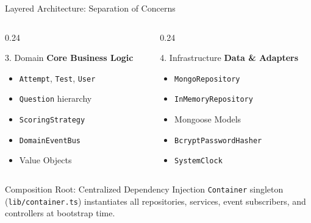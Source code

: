 ﻿\documentclass[aspectratio=169,10pt,t]{beamer}
\begin{document}
\begin{frame}{Layered Architecture: Separation of Concerns}
\begin{columns}[T]
    \begin{column}{0.24\textwidth}
      \begin{infoCard}{3. Domain}
        \textbf{Core Business Logic}\\[0.6mm]
        \fontsize{5.8pt}{7.0pt}\selectfont
        \begin{itemize}\setlength{\itemsep}{1pt}\setlength{\parskip}{0pt}\setlength{\leftmargini}{6pt}
          \item \texttt{Attempt}, \texttt{Test}, \texttt{User}
          \item \texttt{Question} hierarchy
          \item \texttt{ScoringStrategy}
          \item \texttt{DomainEventBus}
          \item Value Objects
        \end{itemize}
      \end{infoCard}
    \end{column}

    \begin{column}{0.24\textwidth}
      \begin{infoCard}{4. Infrastructure}
        \textbf{Data \& Adapters}\\[0.6mm]
        \fontsize{5.8pt}{7.0pt}\selectfont
        \begin{itemize}\setlength{\itemsep}{1pt}\setlength{\parskip}{0pt}\setlength{\leftmargini}{6pt}
          \item \texttt{MongoRepository}
          \item \texttt{InMemoryRepository}
          \item Mongoose Models
          \item \texttt{BcryptPasswordHasher}
          \item \texttt{SystemClock}
        \end{itemize}
      \end{infoCard}
    \end{column}
  \end{columns}

  \vspace{0.8mm}
  \begin{hlCard}{Composition Root: Centralized Dependency Injection}
    \texttt{Container} singleton (\texttt{lib/container.ts}) instantiates all repositories, services, event subscribers, and controllers at bootstrap time.
  \end{hlCard}
\end{frame}
\end{document}
